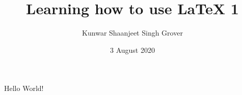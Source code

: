 \documentclass{article}
\title{Learning how to use LaTeX 1}
\author{Kunwar Shaanjeet Singh Grover}
\date{3 August 2020}
\begin{document}
    \maketitle %
    \newpage %

    Hello World!
\end{document}
